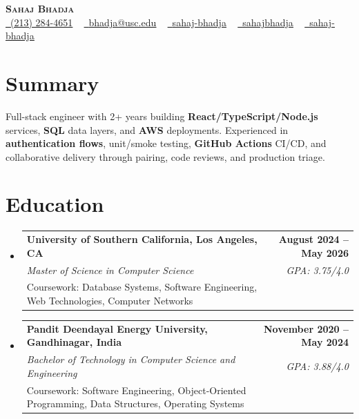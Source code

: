 \documentclass[letterpaper,10pt]{article}
\makeatletter
\newcommand{\resumeEduSubheading}[5]{\vspace{-1pt}\item\begin{tabular*}{1.0\textwidth}[t]{l@{\extracolsep{\fill}}r}\textbf{#1} & \textbf{\small #2} \\\textit{\small #3} & \textit{\small #4} \\\small #5 & \\\end{tabular*}\vspace{-4pt}}
\newcommand{\resumeSubHeadingListStart}{\begin{itemize}[leftmargin=0.0in, label={}]}
\newcommand{\resumeSubHeadingListEnd}{\end{itemize}}
\makeatother
\begin{document}
\begin{center}
{\Huge \scshape \textbf{Sahaj Bhadja}} \\ \vspace{1pt}
\small \href{tel:(213) 284-4651}{\faPhone\ \underline{(213) 284-4651}} ~ \href{mailto:bhadja@usc.edu}{\raisebox{-0.2\height}\faEnvelope\ \underline{bhadja@usc.edu}} ~
\href{https://www.linkedin.com/in/sahaj-bhadja/}{\raisebox{-0.2\height}\faLinkedin\ \underline{sahaj-bhadja}} ~ \href{https://github.com/SAHAJ-BHADJA}{\raisebox{-0.2\height}\faGithub\ \underline{sahajbhadja}} ~
\href{https://sahaj-bhadja.vercel.app/}{\raisebox{-0.2\height}\faGlobe\ \underline{sahaj-bhadja}}
\end{center}
\vspace{-18pt}
\section{Summary}
\begin{itemize}[leftmargin=0.15in, label={}]
\small{\item{Full-stack engineer with 2+ years building \textbf{React/TypeScript/Node.js} services, \textbf{SQL} data layers, and \textbf{AWS} deployments. Experienced in \textbf{authentication flows}, unit/smoke testing, \textbf{GitHub Actions} CI/CD, and collaborative delivery through pairing, code reviews, and production triage.}}
\end{itemize}
\vspace{-16pt}
\section{Education}
\resumeSubHeadingListStart
\resumeEduSubheading{University of Southern California, Los Angeles, CA}{August 2024 -- May 2026}{Master of Science in Computer Science}{GPA: 3.75/4.0}{Coursework: Database Systems, Software Engineering, Web Technologies, Computer Networks}
\vspace{-9pt}
\resumeEduSubheading{Pandit Deendayal Energy University, Gandhinagar, India}{November 2020 -- May 2024}{Bachelor of Technology in Computer Science and Engineering}{GPA: 3.88/4.0}{Coursework: Software Engineering, Object-Oriented Programming, Data Structures, Operating Systems}
\resumeSubHeadingListEnd
\vspace{-14pt}
\end{document}
